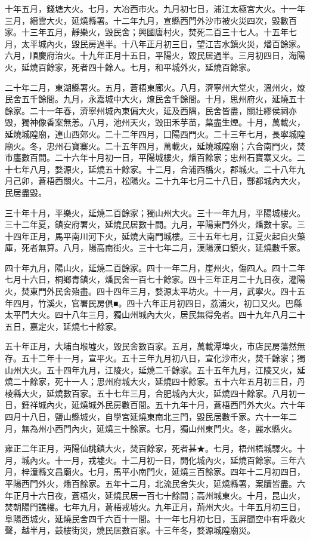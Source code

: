 \begin{pinyinscope}
十年五月，錢塘大火。七月，大冶西市火。九月初七日，浦江太極宮大火。十一年三月，縉雲大火，延燒縣署。十二年九月，宣縣西門外沙市被火災四次，毀數百家。十三年五月，靜樂火，毀民舍；興國唐村火，焚死二百三十七人。十五年七月，太平城內火，毀民房過半。十八年正月初三日，望江吉水鎮火災，燔百餘家。六月，順慶府治火。十九年正月十五日，平陽火，毀民居過半。三月初四日，海陽火，延燒百餘家，死者四十餘人。七月，和平城外火，延燒百餘家。

二十年二月，東湖縣署火。五月，蒼梧東廊火。八月，濟寧州大堂火，溫州火，燎民舍五千餘間。九月，永嘉城中大火，燎民舍千餘間。十月，思州府火，延燒五十餘家。二十一年春，濟寧州城內東偏大火，延及西隅，民舍皆盡，關壯繆侯祠亦毀，獨神像香案無恙。八月，池州天火，毀田禾芋苗，葉盡生煙。十月，萬載火，延燒城隍廟，連山西郊火。二十二年四月，囗陽西門火。二十三年七月，長寧城隍廟火。冬，忠州石寶寨火。二十五年四月，萬載火，延燒城隍廟；六合南門火，焚市廛數百間。二十六年十月初一日，平陽城樓火，燔百餘家；忠州石寶寨又火。二十七年八月，婺源火，延燒五十餘家。十二月，合浦西橋火，郡城火。二十八年九月己卯，蒼梧西關火。十二月，松陽火。二十九年七月二十八日，酆都城內大火，民居盡毀。

三十年十月，平樂火，延燒二百餘家；獨山州大火。三十一年九月，平陽城樓火。三十二年夏，鎮安府署火，延燒民居數十間。九月，平陽東門外火，燔數十家。三十四年正月，馬平南川河下火，延燒大南門城樓。三十五年七月，江夏火起自火藥庫，死者無算。八月，陽高南街火。三十七年二月，漢陽漢口鎮火，延燒數千家。

四十年九月，陽山火，延燒二百餘家。四十一年二月，崖州火，傷四人。四十二年七月十六日，桐鄉青鎮火，燔民舍一百七十餘家。四十三年正月二十九日夜，灌陽火，焚東門外民舍殆盡。四十四年三月，婺源太平坊火。十一月，武寧火。四十五年四月，竹溪火，官署民房俱■。四十六年正月初四日，荔浦火，初囗又火。巴縣太平門大火。四十八年三月，獨山州城內大火，居民無得免者。四十九年八月二十五日，嘉定火，延燒七十餘家。

五十年正月，大埔白堠墟火，毀民舍數百家。五月，萬載潭埠火，市店民房蕩然無存。五十二年十一月，宣平火。五十三年九月初八日，宣化沙市火，焚千餘家；獨山州大火。五十四年九月，江陵火，延燒二千餘家。五十五年九月，江陵又火，延燒二十餘家，死十一人；思州府城大火，延燒四十餘家。五十六年五月初三日，丹棱縣大火，延燒數百家。五十七年三月，合肥城內大火，延燒四十餘家。八月初一日，鍾祥城內火，延燒城外民房數百間。五十九年十月，蒼梧西門外大火。六十年四月十八日，鹽山縣城火，自學宮延燒東南北三門，毀民居數千家。六十一年二月，無為州小西門內火，延燒三十餘家。七月，獨山州東門火。冬，麗水縣火。

雍正二年正月，沔陽仙桃鎮大火，焚百餘家，死者甚★。七月，梧州梧城驛火。十月，城內火。十一月，戎墟火。十二月初一日，開化城內火，延燒百餘家。三年六月，梓潼縣文昌廟火。七月，馬平小南門火，延燒三百餘家。四年十二月初四日，平陽西門外火，燔百餘家。五年十二月，北流民舍失火，延燒縣署，案牘皆盡。六年正月十六日夜，蒼梧火，延燒民居一百七十餘間；高州城東火。十月，昆山火，焚朝陽門譙樓。七年九月，蒼梧戎墟火。九年正月，荊州大火。十年五月初三日，阜陽西城火，延燒民舍四千六百十一間。十一年七月初七日，玉屏聞空中有呼救火聲，越半月，鼓樓街災，燒民居數百家。十三年冬，婺源城隍廟災。


\end{pinyinscope}
